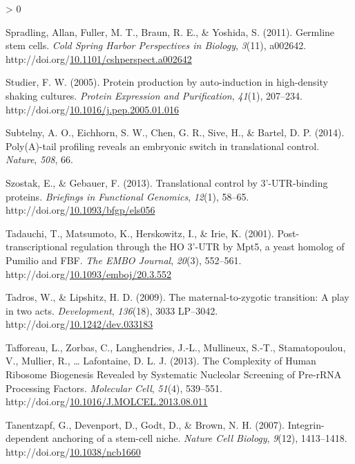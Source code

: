 \documentclass[12pt,oneside]{reedthesis}
\newlength{\cslhangindent}
\newenvironment{CSLReferences}[2] %
 {%
  \setlength{\parindent}{0pt}
  \ifodd #1 \everypar{\setlength{\hangindent}{\cslhangindent}}\ignorespaces\fi
  \ifnum #2 > 0
  \setlength{\parskip}{#2\baselineskip}
  \fi
 }%
 {}
\begin{document}
\begin{CSLReferences}{1}{0}
\leavevmode\hypertarget{ref-Spradling2011f}{}%
Spradling, Allan, Fuller, M. T., Braun, R. E., \& Yoshida, S. (2011). Germline stem cells. \emph{Cold Spring Harbor Perspectives in Biology}, \emph{3}(11), a002642. http://doi.org/\href{https://doi.org/10.1101/cshperspect.a002642}{10.1101/cshperspect.a002642}

\leavevmode\hypertarget{ref-studierProteinProductionAutoinduction2005}{}%
Studier, F. W. (2005). Protein production by auto-induction in high-density shaking cultures. \emph{Protein Expression and Purification}, \emph{41}(1), 207--234. http://doi.org/\href{https://doi.org/10.1016/j.pep.2005.01.016}{10.1016/j.pep.2005.01.016}

\leavevmode\hypertarget{ref-Subtelny2014a}{}%
Subtelny, A. O., Eichhorn, S. W., Chen, G. R., Sive, H., \& Bartel, D. P. (2014). Poly({A})-tail profiling reveals an embryonic switch in translational control. \emph{Nature}, \emph{508}, 66.

\leavevmode\hypertarget{ref-Szostak2013l}{}%
Szostak, E., \& Gebauer, F. (2013). Translational control by 3'-{UTR-binding} proteins. \emph{Briefings in Functional Genomics}, \emph{12}(1), 58--65. http://doi.org/\href{https://doi.org/10.1093/bfgp/els056}{10.1093/bfgp/els056}

\leavevmode\hypertarget{ref-Tadauchi2001a}{}%
Tadauchi, T., Matsumoto, K., Herskowitz, I., \& Irie, K. (2001). Post-transcriptional regulation through the {HO} 3'-{UTR} by {Mpt5}, a yeast homolog of {Pumilio} and {FBF}. \emph{The EMBO Journal}, \emph{20}(3), 552--561. http://doi.org/\href{https://doi.org/10.1093/emboj/20.3.552}{10.1093/emboj/20.3.552}

\leavevmode\hypertarget{ref-Tadros2009c}{}%
Tadros, W., \& Lipshitz, H. D. (2009). The maternal-to-zygotic transition: A play in two acts. \emph{Development}, \emph{136}(18), 3033 LP--3042. http://doi.org/\href{https://doi.org/10.1242/dev.033183}{10.1242/dev.033183}

\leavevmode\hypertarget{ref-Tafforeau2013a}{}%
Tafforeau, L., Zorbas, C., Langhendries, J.-L., Mullineux, S.-T., Stamatopoulou, V., Mullier, R., \ldots{} Lafontaine, D. L. J. (2013). The {Complexity} of {Human Ribosome Biogenesis Revealed} by {Systematic Nucleolar Screening} of {Pre-rRNA Processing Factors}. \emph{Molecular Cell}, \emph{51}(4), 539--551. http://doi.org/\href{https://doi.org/10.1016/J.MOLCEL.2013.08.011}{10.1016/J.MOLCEL.2013.08.011}

\leavevmode\hypertarget{ref-tanentzapfIntegrindependentAnchoringStemcell2007}{}%
Tanentzapf, G., Devenport, D., Godt, D., \& Brown, N. H. (2007). Integrin-dependent anchoring of a stem-cell niche. \emph{Nature Cell Biology}, \emph{9}(12), 1413--1418. http://doi.org/\href{https://doi.org/10.1038/ncb1660}{10.1038/ncb1660}


\end{CSLReferences}
\end{document}
